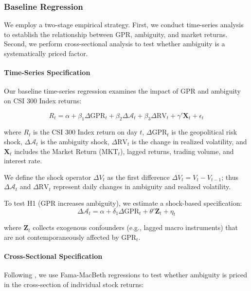 \documentclass[preprint,12pt,authoryear]{elsarticle}
\begin{document}
\subsubsection{Baseline Regression}

We employ a two-stage empirical strategy. First, we conduct time-series analysis to establish the relationship between GPR, ambiguity, and market returns. Second, we perform cross-sectional analysis to test whether ambiguity is a systematically priced factor.

\paragraph{Time-Series Specification}
Our baseline time-series regression examines the impact of GPR and ambiguity on CSI 300 Index returns:

\begin{equation}
R_{t} = \alpha + \beta_1 \Delta \text{GPR}_{t} + \beta_2 \Delta \mathcal{A}_{t} + \beta_3 \Delta \text{RV}_{t} + \gamma' \mathbf{X}_{t} + \epsilon_{t}
\end{equation}

where $R_t$ is the CSI 300 Index return on day $t$, $\Delta \text{GPR}_t$ is the geopolitical risk shock, $\Delta \mathcal{A}_t$ is the ambiguity shock, $\Delta \text{RV}_t$ is the change in realized volatility, and $\mathbf{X}_t$ includes the Market Return ($\text{MKT}_t$), lagged returns, trading volume, and interest rate.

We define the shock operator $\Delta V_t$ as the first difference $\Delta V_t = V_t - V_{t-1}$; thus $\Delta \mathcal{A}_t$ and $\Delta \text{RV}_t$ represent daily changes in ambiguity and realized volatility.

To test H1 (GPR increases ambiguity), we estimate a shock-based specification:
\begin{equation}
\Delta \mathcal{A}_{t} = \alpha + \delta_1 \Delta \text{GPR}_{t} + \theta' \mathbf{Z}_{t} + \eta_{t}
\end{equation}

where $\mathbf{Z}_t$ collects exogenous confounders (e.g., lagged macro instruments) that are not contemporaneously affected by $\text{GPR}_t$.

\paragraph{Cross-Sectional Specification}
Following \citet{Fama1992Cross}, we use Fama-MacBeth regressions to test whether ambiguity is priced in the cross-section of individual stock returns:
\end{document}
